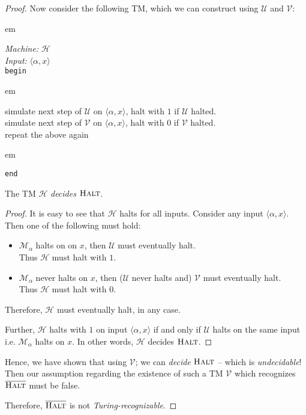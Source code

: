 \documentclass[usletter]{article}
\newcommand {\machine}[1]      {\ensuremath{\mathscr{#1}}}
\newcommand {\namedlangset}[1] {\ensuremath{\textnormal{\textsc{#1}}}}
\newcommand {\term}[1]      {\textit{#1}}
\newcommand {\indpar}[1]   {
  \par\leftskip=#1em
  \noindent\ignorespaces
}
\newenvironment{turing}[2] {
  \smallskip
  \indpar{2}
  \textit{Machine:} #1\\
  \textit{Input:} $#2$\\[5pt]
  \texttt{begin}
  \parskip=0pt
  \indpar{3}
}{
  \indpar{2}
  \texttt{end}
  \par\medskip
}
\newcommand {\machineM}       {\machine{M}}
\begin{document}
\begin{enumerate}[labelsep=2.5em, label=\textbf{\arabic{enumi}}]
\begin{proof}
    Now consider the following TM, which we can construct using \machine{U} and
    \machine{V}:
    \begin{turing}{\machine{H}}{\langle  \alpha, x \rangle}
      simulate next step of \machine{U} on $\langle  \alpha, x \rangle$,
      halt with $1$ if \machine{U} halted. \\
      simulate next step of \machine{V} on $\langle  \alpha, x \rangle$,
      halt with $0$ if \machine{V} halted. \\
      repeat the above again
    \end{turing}

    \begin{claim}
      The TM \machine{H} \term{decides} \namedlangset{Halt}.
    \end{claim}
    \begin{proof}
      It is easy to see that \machine{H} halts for all inputs. Consider any
      input $\langle \alpha, x \rangle$. Then one of the following must hold:
      \begin{itemize}
        \item $\machineM_\alpha$ halts on on $x$, then \machine{U} must
          eventually halt. \\
          Thus \machine{H} must halt with $1$.
        \item $\machineM_\alpha$ never halts on $x$, then (\machine{U} never
          halts and) \machine{V} must eventually halt. \\
          Thus \machine{H} must halt with $0$.
      \end{itemize}
      Therefore, \machine{H} must eventually halt, in any case.

      Further, \machine{H} halts with $1$ on input $\langle \alpha, x \rangle$
      if and only if \machine{U} halts on the same input i.e. $\machineM_\alpha$
      halts on $x$. In other words, \machine{H} decides \namedlangset{Halt}.
    \end{proof}

    Hence, we have shown that using \machine{V}; we can \term{decide}
    \namedlangset{Halt} -- which is \term{undecidable}! \\
    Then our assumption regarding the existence of such a TM \machine{V} which
    recognizes $\overline{\namedlangset{Halt}}$ must be false.

    Therefore, $\overline{\namedlangset{Halt}}$ is not
    \term{Turing-recognizable}.
  \end{proof}



\end{enumerate}
\end{document}
